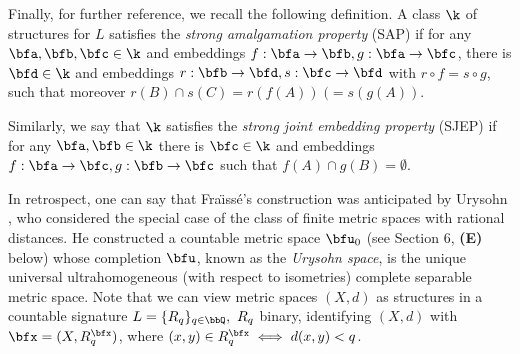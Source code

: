 Finally, for further reference, we recall the following definition. A
class $\k$ of structures for $L$ satisfies the {\it strong amalgamation
        property} (SAP) if for any $\bfa ,\bfb ,\bfc \in\k$ and embeddings $f:
    \bfa\rightarrow\bfb ,g:\bfa\rightarrow\bfc$, there is $\bfd\in\k$ and
embeddings $r:\bfb\rightarrow\bfd ,s:\bfc\rightarrow\bfd$ with $r\circ
    f=s\circ g$, such that moreover $r(B)\cap s(C)=r(f(A))\; (=s(g(A))$.

Similarly, we say that $\k$ satisfies the {\it strong joint embedding
        property} (SJEP) if for any $\bfa ,\bfb\in\k$ there is $\bfc\in\k$
and embeddings $f:\bfa\rightarrow\bfc ,g:\bfb\rightarrow\bfc$ such that
$f(A)\cap g(B)=\emptyset$.

\begin{remark}
    In retrospect, one can say that Fra\"{\i}ss\'e's construction
    was anticipated by Urysohn \cite{U}, who considered the special case of
    the class of finite metric spaces with rational distances.
    He constructed a countable metric space $\bfu_0$ (see Section 6, {\bf (E)} below)
    whose completion $\bfu$, known as the
        {\it Urysohn space}, is the unique universal ultrahomogeneous (with
    respect to isometries) complete separable metric space.  Note that we
    can view metric spaces $(X,d)$ as structures in a countable signature
    $L=\{R_q\}_{q\in\bbQ},\ R_q$ binary, identifying $(X,d)$ with $ \bfx
        =(X,R^\bfx_q)$, where $(x,y)\in R^\bfx_q\iff d(x,y)<q$.
\end{remark}
